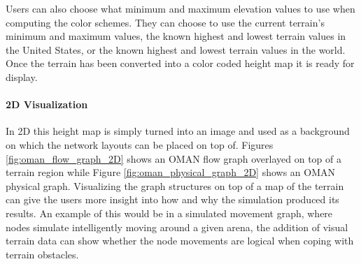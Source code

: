 Users can also choose what minimum and maximum elevation values to use when computing the color schemes.  They can choose to use the current terrain's minimum and maximum values, the known highest and lowest terrain values in the United States, or the known highest and lowest terrain values in the world.  Once the terrain has been converted into a color coded height map it is ready for display.  

\paragraph{2D Visualization}
In 2D this height map is simply turned into an image and used as a background on which the network layouts can be placed on top of.  Figures \ref{fig:oman_flow_graph_2D} shows an OMAN flow graph overlayed on top of a terrain region while Figure \ref{fig:oman_physical_graph_2D} shows an OMAN physical graph.  Visualizing the graph structures on top of a map of the terrain can give the users more insight into how and why the simulation produced its results.  An example of this would be in a simulated movement graph, where nodes simulate intelligently moving around a given arena, the addition of visual terrain data can show whether the node movements are logical when coping with terrain obstacles.

